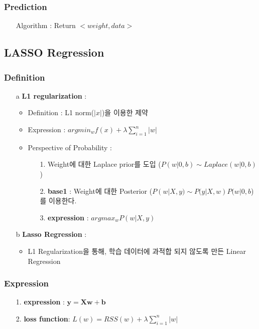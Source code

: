 \documentclass{article}
\begin{document}
\subsubsection{Prediction}
\begin{itemize}
    \item[Algorithm] : Return $<weight, data>$ 
\end{itemize}

\subsection{LASSO Regression}
\subsubsection{Definition}
\begin{itemize}
    \item[a] \textbf{L1 regularization} : 
    \begin{itemize}
        \item Definition : L1 norm($|x|$)을 이용한 제약
        \item Expression : $argmin_w {f(x) +\lambda\sum_{i=1}^{n}{|w|}}$
        \item Perspective of Probability :
        \begin{itemize}
            \item[1.] Weight에 대한 Laplace prior를 도입 ($P(w|0,b) \sim Laplace(w | 0,b)$)
            \item[2.] \textbf{base1} : Weight에 대한 Posterior ($P(w|X,y) \sim P(y|X,w)P(w|0,b$)를 이용한다.
            \item[3.] \textbf{expression} : $argmax_w P(w|X,y)$
        \end{itemize}
       
    \end{itemize}
    \item[b] \textbf{Lasso Regression} : 
        \begin{itemize}
            \item L1 Regularization을 통해, 학습 데이터에  과적합 되지 않도록 만든 Linear Regression
        \end{itemize}
\end{itemize}

\subsubsection{Expression}
\begin{itemize}
    \item[1.] \textbf{expression} : $\boldsymbol{y = Xw+b}$
    \item[2.] \textbf{loss function}: $L(w) = RSS(w) + \lambda\sum_{i=1}^{n}{|w|}$
\end{itemize}
\end{document}
